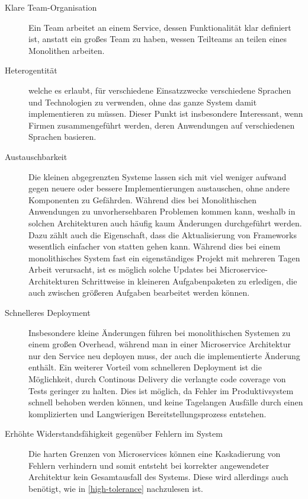 \documentclass[12pt,a4paper,bibliography=totocnumbered,listof=totocnumbered]{scrartcl}
\begin{document}
\begin{description}
	
	\item[Klare Team-Organisation] Ein Team arbeitet an einem Service, dessen Funktionalität klar definiert ist, anstatt ein großes Team zu haben, wessen Teilteams an teilen eines Monolithen arbeiten.
	
	\item[Heterogentität] welche es erlaubt, für verschiedene Einsatzzwecke verschiedene Sprachen und Technologien zu verwenden, ohne das ganze System damit implementieren zu müssen. Dieser Punkt ist insbesondere Interessant, wenn Firmen zusammengeführt werden, deren Anwendungen auf verschiedenen Sprachen basieren.
	
	\item[Austauschbarkeit] Die kleinen abgegrenzten Systeme lassen sich mit viel weniger aufwand gegen neuere oder bessere Implementierungen austauschen, ohne andere Komponenten zu Gefährden. Während dies bei Monolithischen Anwendungen zu unvorhersehbaren Problemen kommen kann, weshalb in solchen Architekturen auch häufig kaum Änderungen durchgeführt werden. Dazu zählt auch die Eigenschaft, dass die Aktualisierung von Frameworks wesentlich einfacher von statten gehen kann. Während dies bei einem monolithisches System fast ein eigenständiges Projekt mit mehreren Tagen Arbeit verursacht, ist es möglich solche Updates bei Microservice-Architekturen Schrittweise in kleineren Aufgabenpaketen zu erledigen, die auch zwischen größeren Aufgaben bearbeitet werden können.
	
	\item[Schnelleres Deployment] Insbesondere kleine Änderungen führen bei monolithischen Systemen zu einem großen Overhead, während man in einer Microservice Architektur nur den Service neu deployen muss, der auch die implementierte Änderung enthält. Ein weiterer Vorteil vom schnelleren Deployment ist die Möglichkeit, durch Continous Delivery die verlangte code coverage von Tests geringer zu halten. Dies ist möglich, da Fehler im Produktivsystem schnell behoben werden können, und keine Tagelangen Ausfälle durch einen komplizierten und Langwierigen Bereitstellungsprozess entstehen.
	
	\item[Erhöhte Widerstandsfähigkeit gegenüber Fehlern im System] Die harten Grenzen von Microservices können eine Kaskadierung von Fehlern verhindern und somit entsteht bei korrekter angewendeter Architektur kein Gesamtausfall des Systems. Diese wird allerdings auch benötigt, wie in \ref{high-tolerance} nachzulesen ist. 
	

\end{description}
\end{document}
